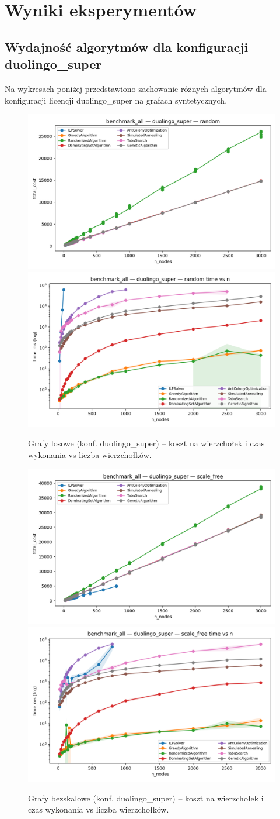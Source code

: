 \section{Wyniki eksperymentów}

\subsection{Wydajność algorytmów dla konfiguracji duolingo\_super}

Na wykresach poniżej przedstawiono zachowanie różnych algorytmów dla konfiguracji licencji duolingo\_super na grafach syntetycznych.

\begin{figure}[H]
  \centering
  \includegraphics[width=0.48\linewidth]{assets/figures/ba_random_duo_cost_vs_n.png}
  \includegraphics[width=0.48\linewidth]{assets/figures/ba_random_duo_time_vs_n.png}
  \caption{Grafy losowe (konf. duolingo\_super) -- koszt na wierzchołek i czas wykonania vs liczba wierzchołków.}
  \label{fig:random_performance}
\end{figure}

\begin{figure}[H]
  \centering
  \includegraphics[width=0.48\linewidth]{assets/figures/ba_scale_free_duo_cost_vs_n.png}
  \includegraphics[width=0.48\linewidth]{assets/figures/ba_scale_free_duo_time_vs_n.png}
  \caption{Grafy bezskalowe (konf. duolingo\_super) -- koszt na wierzchołek i czas wykonania vs liczba wierzchołków.}
  \label{fig:scale_free_performance}
\end{figure}

